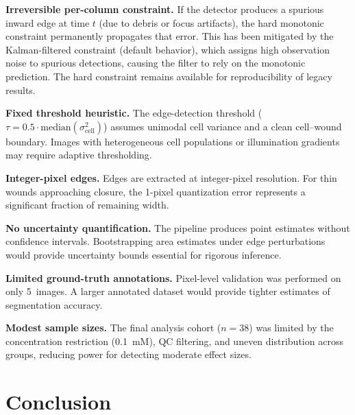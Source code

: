 \textbf{Irreversible per-column constraint.} If the detector produces a spurious inward edge at time $t$ (due to debris or focus artifacts), the hard monotonic constraint permanently propagates that error. This has been mitigated by the Kalman-filtered constraint (default behavior), which assigns high observation noise to spurious detections, causing the filter to rely on the monotonic prediction. The hard constraint remains available for reproducibility of legacy results.

\textbf{Fixed threshold heuristic.} The edge-detection threshold ($\tau = 0.5 \cdot \mathrm{median}(\sigma^2_\text{cell})$) assumes unimodal cell variance and a clean cell--wound boundary. Images with heterogeneous cell populations or illumination gradients may require adaptive thresholding.

\textbf{Integer-pixel edges.} Edges are extracted at integer-pixel resolution. For thin wounds approaching closure, the 1-pixel quantization error represents a significant fraction of remaining width.

\textbf{No uncertainty quantification.} The pipeline produces point estimates without confidence intervals. Bootstrapping area estimates under edge perturbations would provide uncertainty bounds essential for rigorous inference.

\textbf{Limited ground-truth annotations.} Pixel-level validation was performed on only 5~images. A larger annotated dataset would provide tighter estimates of segmentation accuracy.

\textbf{Modest sample sizes.} The final analysis cohort ($n = 38$) was limited by the concentration restriction (0.1~mM), QC filtering, and uneven distribution across groups, reducing power for detecting moderate effect sizes.

\section{Conclusion}

